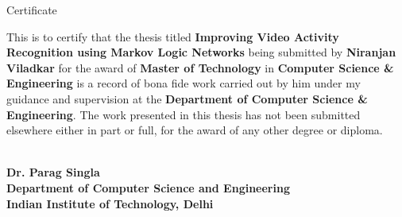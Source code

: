 \begin{center}
\LARGE{ Certificate} 
\end{center}

\vspace{0.5in}

This is to certify that the thesis titled {\bfseries Improving Video Activity Recognition using Markov Logic Networks} being submitted by
{\bfseries Niranjan Viladkar} for the award of {\bfseries Master of Technology} in {\bfseries Computer Science \& Engineering} 
is a record of bona fide work carried out by him under my guidance and supervision at the {\bfseries Department of Computer Science \& Engineering}. 
The work presented in this thesis has not been submitted elsewhere either in part or full, for the award of any other degree or diploma.

\vspace{1.5in}

\underline{\hspace{5cm}}\\
{\bfseries Dr. Parag Singla} \\
{\bfseries Department of Computer Science and Engineering} \\
{\bfseries Indian Institute of Technology, Delhi}\\ 
